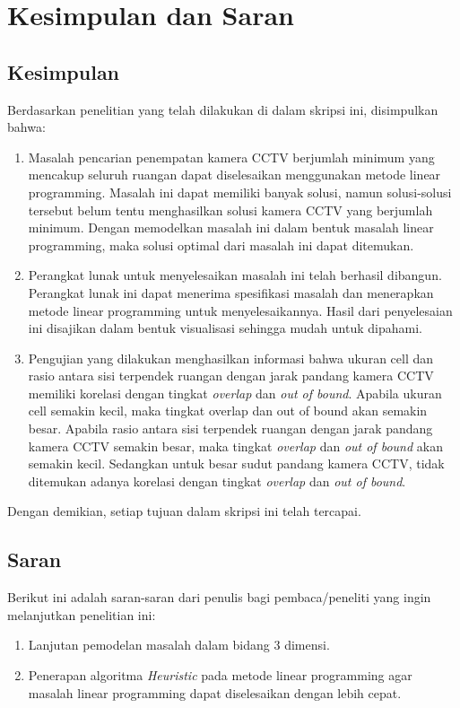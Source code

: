 \chapter{Kesimpulan dan Saran}

\section{Kesimpulan}
Berdasarkan penelitian yang telah dilakukan di dalam skripsi ini, disimpulkan bahwa:
\begin{enumerate}
	\item Masalah pencarian penempatan kamera CCTV berjumlah minimum yang mencakup seluruh ruangan dapat diselesaikan menggunakan metode linear programming. Masalah ini dapat memiliki banyak solusi, namun solusi-solusi tersebut belum tentu menghasilkan solusi kamera CCTV yang berjumlah minimum. Dengan memodelkan masalah ini dalam bentuk masalah linear programming, maka solusi optimal dari masalah ini dapat ditemukan.
	\item Perangkat lunak untuk menyelesaikan masalah ini telah berhasil dibangun. Perangkat lunak ini dapat menerima spesifikasi masalah dan menerapkan metode linear programming untuk menyelesaikannya. Hasil dari penyelesaian ini disajikan dalam bentuk visualisasi sehingga mudah untuk dipahami.
	\item Pengujian yang dilakukan menghasilkan informasi bahwa ukuran cell dan rasio antara sisi terpendek ruangan dengan jarak pandang kamera CCTV memiliki korelasi dengan tingkat \textit{overlap} dan \textit{out of bound}. Apabila ukuran cell semakin kecil, maka tingkat overlap dan out of bound akan semakin besar. Apabila rasio antara sisi terpendek ruangan dengan jarak pandang kamera CCTV semakin besar, maka tingkat \textit{overlap} dan \textit{out of bound} akan semakin kecil. Sedangkan untuk besar sudut pandang kamera CCTV, tidak ditemukan adanya korelasi dengan tingkat \textit{overlap} dan \textit{out of bound}.
\end{enumerate}
Dengan demikian, setiap tujuan dalam skripsi ini telah tercapai.

\section{Saran}
Berikut ini adalah saran-saran dari penulis bagi pembaca/peneliti yang ingin melanjutkan penelitian ini:
\begin{enumerate}
	\item Lanjutan pemodelan masalah dalam bidang 3 dimensi.
	\item Penerapan algoritma \textit{Heuristic} pada metode linear programming agar masalah linear programming dapat diselesaikan dengan lebih cepat.
\end{enumerate}